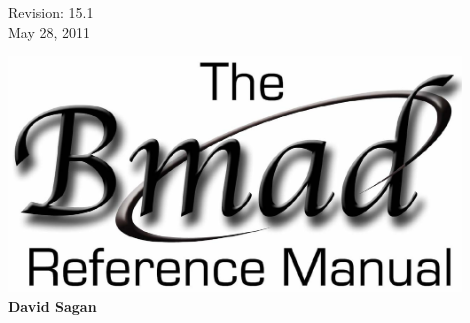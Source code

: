 \thispagestyle{empty}

\begin{flushright}
\large
  Revision: 15.1 \\
  May 28, 2011 \\
\end{flushright}

\vfill

{
\begin{center}
\includegraphics[width=12cm]{bmad-ref-manual.pdf} \\
\vskip 0.3in
\huge\bf David Sagan
\end{center}
}

\vfill
\break

